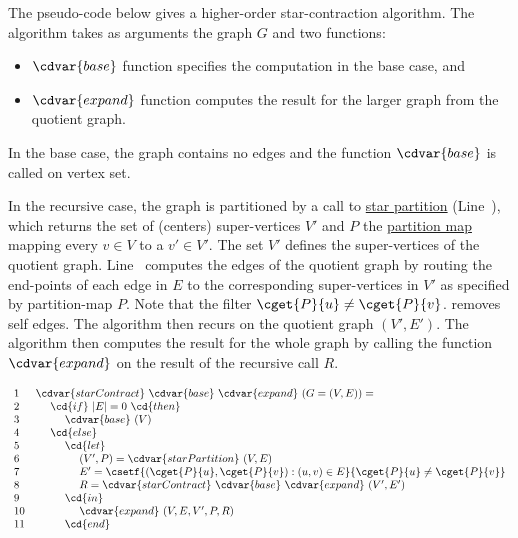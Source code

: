 \begin{algorithm}
\label{alg:graphcon::star-contraction}

The pseudo-code below gives a higher-order
star-contraction algorithm.
%
The algorithm takes as arguments the graph $G$ and two functions:
\begin{itemize}
\item  $\cdvar{base}$ function specifies the computation in the base case, and

\item  $\cdvar{expand}$ function computes the result for the larger
graph from the quotient graph.

\end{itemize}


In the base case, the graph contains no edges and the function
$\cdvar{base}$ is called on vertex set.

In the recursive case, the graph is partitioned by a call to
%
\href{alg:graphcon::star-partition}{star partition} 
(Line~\linegcscpartition{}),
%
which  returns the set of (centers) super-vertices
$V'$ and $P$ the
%
\href{def:graphcon::intro::prelim::partition-map}{partition map}
%
mapping every $v \in V$ to a $v' \in V'$.
%
The set $V'$ defines the super-vertices of the quotient graph.
%
Line~\linegcscedges{} computes the edges of the quotient graph by
routing the end-points of each edge in $E$ to the corresponding
super-vertices in $V'$ as specified by partition-map $P$.
%
Note that the filter $\cget{P}{u} \neq \cget{P}{v}$.
removes self edges.
%
The algorithm then recurs on the quotient graph $(V', E')$.
%
The algorithm then computes the result for the whole graph by calling
the function $\cdvar{expand}$ on the result of the recursive call $R$.

%


\[
\begin{array}{ll}
1 & \cdvar{starContract}~\cdvar{base}~\cdvar{expand}~(G = (V,E)) =
\\ 
2 & ~~~~\cd{if}~|E| = 0~\cd{then}
\\
3 & ~~~~~~~~\cdvar{base}~(V)
\\
4 & ~~~~\cd{else}
\\ 
5 & ~~~~~~~~\cd{let}
\\ 
6 & ~~~~~~~~~~~~(V',P) = \cdvar{starPartition}~(V,E)~ %
\\
7 & ~~~~~~~~~~~~E' = \csetf{(\cget{P}{u},\cget{P}{v}) : (u,v) \in  E}{\cget{P}{u} \neq \cget{P}{v}} 
\\
8 & ~~~~~~~~~~~~R = \cdvar{starContract}~\cdvar{base}~\cdvar{expand}~(V',E')
\\
9 & ~~~~~~~~\cd{in}
\\
10 & ~~~~~~~~~~~~\cdvar{expand}~(V, E, V', P, R)
\\
11 & ~~~~~~~~\cd{end}
\end{array}
\]

\end{algorithm}


